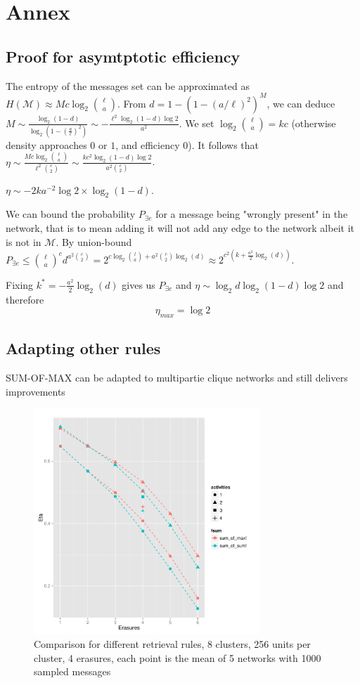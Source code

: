 \documentclass[english,10pt,twocolumn]{IEEEtran}
\renewcommand{\le}{\leqslant}
\theoremstyle{definition}
\begin{document}
	
	
	\section*{Annex}
	
	\subsection*{Proof for asymtptotic efficiency}
	
	The entropy of the messages set can be approximated as $H(\mathcal{M}) \approx M c \log_2 {\ell \choose a}$. From $d = 1 - \left (1- \left(a/\ell\right)^2 \right)^M$, we can deduce $M \sim \frac{\log_2(1-d)}{\log_2(1-(\frac{a}{\ell})^2)} \sim - \frac{\ell^2 \log_2(1-d) \log 2}{a^2}$.
		We set $\log_2 {\ell \choose a} = k c$ (otherwise density approaches $0$ or $1$, and efficiency $0$). It follows that $\eta \sim \frac{M c \log_2 {\ell \choose a}}{\ell^2 {c \choose 2}} \sim \frac{k c^2 \log_2(1-d)\log 2}{a^2 {c \choose 2}}$. 
		
		$\eta \sim - 2 k  a^{-2}\log 2 \times \log_2 (1-d)$.
		
		We can bound the probability $P_{\exists e}$ for a message being "wrongly present" in the network, that is to mean adding it will not add any edge to the network albeit it is not in $\mathcal{M}$. By union-bound $P_{\exists e} \le {\ell \choose a}^c d^{a^2 {c \choose 2}} = 2^{c \log_ 2 {l \choose a} + a^2 {c \choose 2 }\log_2(d)} \approx 2^{c^2(k + \frac{a^2}{2} \log_2 (d))}$.
		
		Fixing $k^* = -\frac{a^2}{2} \log_2 (d)$ gives us $P_{\exists e}$ and $\eta \sim \log_2 d \log_2 (1-d) \log 2$ and therefore \[\eta_{max} = \log 2\]	
	
	\subsection*{Adapting other rules}
	
	SUM-OF-MAX can be adapted to multipartie clique networks and still delivers improvements
	
	\begin{figure}[!htb]
		\includegraphics[width=8.5cm]{Courbes/comp_rulesmax}%
		\caption{Comparison for different retrieval rules, 8 clusters, 256 units per cluster, 4 erasures, each point is the mean of 5 networks with 1000 sampled messages}
		\label{fmaxth}
	\end{figure}
	
	
	
	
	\nocite{*}
     {}
\end{document}
